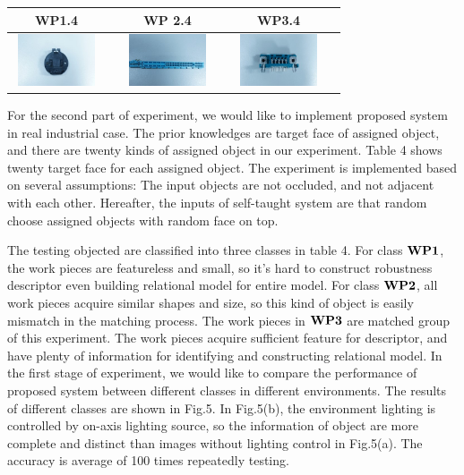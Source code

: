 \documentclass[journal]{IEEEtran}
\begin{document}
\begin{table}[!t]
\begin{center}
\begin{tabular}{|c|c||c|c||c|c|}
\hline
WP1.4 & & WP 2.4 & & WP3.4 &\\
\hline
\includegraphics[width=1in,height=0.6in]{j_img/wp14.jpg} & 
 & 
\includegraphics[width=1in,height=0.6in]{j_img/wp24.jpg} & 
 &
\includegraphics[width=1in,height=0.6in]{j_img/wp34.jpg} & 
\\ 
\hline
\end{tabular}
\end{center}
\end{table}

For the second part of experiment, we would like to implement proposed system in real industrial case. The prior knowledges are target face of assigned object, and there are twenty kinds of assigned object in our experiment. Table 4 shows twenty target face for each assigned object. The experiment is implemented based on several assumptions: The input objects are not occluded, and not adjacent with each other. Hereafter, the inputs of self-taught system are that random choose assigned objects with random face on top. 

The testing objected are classified into three classes in table 4. For class $\bf{WP1}$, the work pieces are featureless and small, so it's hard to construct robustness descriptor even building relational model for entire model. For class $\bf{WP2}$, all work pieces acquire similar shapes and size, so this kind of object is easily mismatch in the matching process. The work pieces in $\bf{WP3}$ are matched group of this experiment. The work pieces acquire sufficient feature for descriptor, and have plenty of information for identifying and constructing relational model. In the first stage of experiment, we would like to compare the performance of proposed system between different classes in different environments.  The results of different classes are shown in Fig.5. In Fig.5(b), the environment lighting is controlled by on-axis lighting source, so the information of object are more complete and distinct than images without lighting control in Fig.5(a). The accuracy is average of 100 times repeatedly testing.
\end{document}
